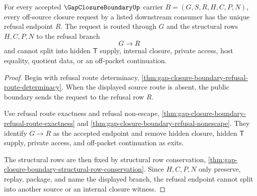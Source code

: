 \begin{theorem}
\label{thm:gap-closure-boundary-refusal-branch-determinacy}
For every accepted $\GapClosureBoundaryUp$ carrier $B=(G,S,R,H,C,P,N)$, every off-source closure request by a listed downstream consumer has the unique refusal endpoint $R$. The request is routed through $G$ and the structural rows $H,C,P,N$ to the refusal branch
$$
G \longrightarrow R
$$
and cannot split into hidden $\mathsf{T}$ supply, internal closure, private access, host equality, quotient data, or an off-packet continuation.
\end{theorem}
\begin{proof}
Begin with refusal route determinacy, \autoref{thm:gap-closure-boundary-refusal-route-determinacy}. When the displayed source route is absent, the public boundary sends the request to the refusal row $R$.

Use refusal route exactness and refusal non-escape, \autoref{thm:gap-closure-boundary-refusal-route-exactness} and \autoref{thm:gap-closure-boundary-refusal-nonescape}. They identify $G \longrightarrow R$ as the accepted endpoint and remove hidden closure, hidden $\mathsf{T}$ supply, private access, and off-packet continuation as exits.

The structural rows are then fixed by structural row conservation, \autoref{thm:gap-closure-boundary-structural-row-conservation}. Since $H,C,P,N$ only preserve, replay, package, and name the displayed branch, the refusal endpoint cannot split into another source or an internal closure witness.
\end{proof}

